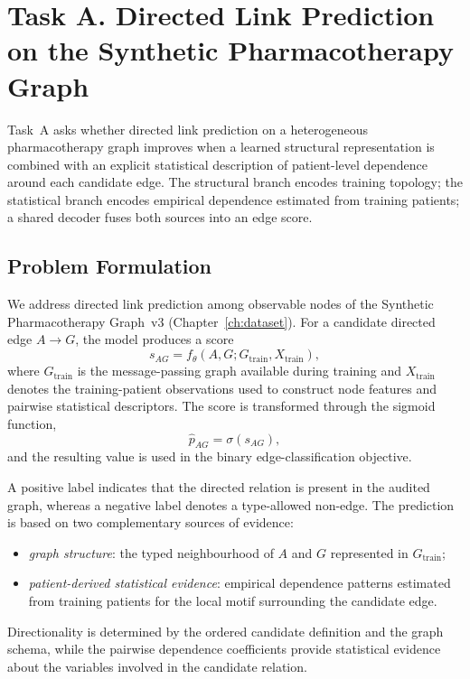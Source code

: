 \chapter{Task A. Directed Link Prediction on the Synthetic Pharmacotherapy Graph}
\label{ch:taskA-rozwiazanie}
\label{ch:taskA-ewaluacja}
\label{ch:taskA-benchmark}

Task~A asks whether directed link prediction on a heterogeneous pharmacotherapy graph improves when a learned structural representation is combined with an explicit statistical description of patient-level dependence around each candidate edge.
The structural branch encodes training topology; the statistical branch encodes empirical dependence estimated from training patients; a shared decoder fuses both sources into an edge score.

\section{Problem Formulation}
\label{sec:taskA-problem}

We address directed link prediction among observable nodes of the Synthetic Pharmacotherapy Graph~v3 (Chapter~\ref{ch:dataset}).
For a candidate directed edge $A\to G$, the model produces a score
\begin{equation}
\label{eq:taskA-score}
s_{AG}=f_{\theta}(A,G;G_{\mathrm{train}},X_{\mathrm{train}}),
\end{equation}
where $G_{\mathrm{train}}$ is the message-passing graph available during training and $X_{\mathrm{train}}$ denotes the training-patient observations used to construct node features and pairwise statistical descriptors.
The score is transformed through the sigmoid function,
\begin{equation}
\label{eq:taskA-objective}
\hat{p}_{AG}=\sigma(s_{AG}),
\end{equation}
and the resulting value is used in the binary edge-classification objective.

A positive label indicates that the directed relation is present in the audited graph, whereas a negative label denotes a type-allowed non-edge.
The prediction is based on two complementary sources of evidence:
\begin{itemize}
\item \emph{graph structure}: the typed neighbourhood of $A$ and $G$ represented in $G_{\mathrm{train}}$;
\item \emph{patient-derived statistical evidence}: empirical dependence patterns estimated from training patients for the local motif surrounding the candidate edge.
\end{itemize}
Directionality is determined by the ordered candidate definition and the graph schema, while the pairwise dependence coefficients provide statistical evidence about the variables involved in the candidate relation.

